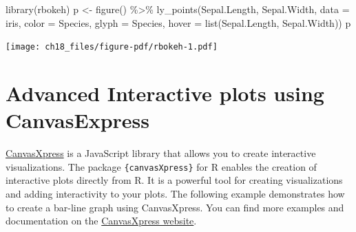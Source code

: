 \documentclass[
  letterpaper,
]{scrbook}
\newenvironment{Shaded}{\begin{snugshade}}{\end{snugshade}}
\newcommand{\AttributeTok}[1]{\textcolor[rgb]{0.40,0.45,0.13}{#1}}
\newcommand{\FunctionTok}[1]{\textcolor[rgb]{0.28,0.35,0.67}{#1}}
\newcommand{\NormalTok}[1]{\textcolor[rgb]{0.00,0.23,0.31}{#1}}
\newcommand{\OtherTok}[1]{\textcolor[rgb]{0.00,0.23,0.31}{#1}}
\newcommand{\SpecialCharTok}[1]{\textcolor[rgb]{0.37,0.37,0.37}{#1}}
\begin{document}
\begin{Shaded}
\begin{Highlighting}[]
\FunctionTok{library}\NormalTok{(rbokeh)}
\NormalTok{p }\OtherTok{\textless{}{-}} \FunctionTok{figure}\NormalTok{() }\SpecialCharTok{\%\textgreater{}\%}
  \FunctionTok{ly\_points}\NormalTok{(Sepal.Length, Sepal.Width, }\AttributeTok{data =}\NormalTok{ iris,}
    \AttributeTok{color =}\NormalTok{ Species, }\AttributeTok{glyph =}\NormalTok{ Species,}
    \AttributeTok{hover =} \FunctionTok{list}\NormalTok{(Sepal.Length, Sepal.Width))}
\NormalTok{p}
\end{Highlighting}
\end{Shaded}

\texttt{[image: ch18\_files/figure-pdf/rbokeh-1.pdf]}

\section{Advanced Interactive plots using
CanvasExpress}\label{advanced-interactive-plots-using-canvasexpress}

\href{https://www.canvasxpress.org/}{CanvasXpress} is a JavaScript
library that allows you to create interactive visualizations. The
package \texttt{\{canvasXpress\}} for R enables the creation of
interactive plots directly from R. It is a powerful tool for creating
visualizations and adding interactivity to your plots. The following
example demonstrates how to create a bar-line graph using CanvasXpress.
You can find more examples and documentation on the
\href{https://www.canvasxpress.org/}{CanvasXpress website}.
\end{document}
